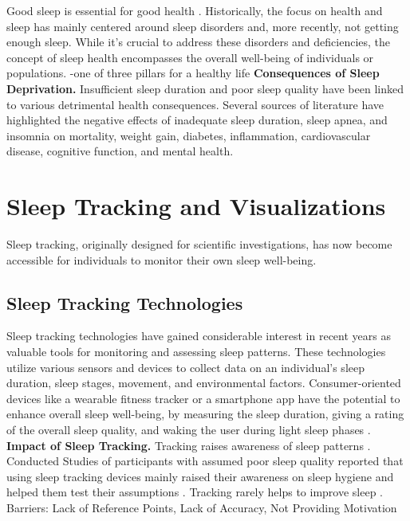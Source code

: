 \documentclass[
  a4paper,  %
  twoside,  %
  bibliography=totoc,
  headsepline,
  cleardoublepage=empty,
  parskip=half,
  draft=false
]{scrbook}
\begin{document}
Good sleep is essential for good health \cite{buysse_sleep_2014, grandner_sleep_2017, ramar_sleep_2021}. Historically, the focus on health and sleep has mainly centered around sleep disorders and, more recently, not getting enough sleep. While it's crucial to address these disorders and deficiencies, the concept of sleep health encompasses the overall well-being of individuals or populations\cite{buysse_sleep_2014}.
\newline
-one of three pillars for a healthy life
\newline
\newline
\textbf{Consequences of Sleep Deprivation.}
Insufficient sleep duration and poor sleep quality have been linked to various detrimental health consequences. Several sources of literature have highlighted the negative effects of inadequate sleep duration, sleep apnea, and insomnia on mortality, weight gain, diabetes, inflammation, cardiovascular disease, cognitive function, and mental health. \cite{grandner_sleep_2017}

\section{Sleep Tracking and Visualizations}
Sleep tracking, originally designed for scientific investigations, has now become accessible for individuals to monitor their own sleep well-being. 
\subsection{Sleep Tracking Technologies}
Sleep tracking technologies have gained considerable interest in recent years as valuable tools for monitoring and assessing sleep patterns. These technologies utilize various sensors and devices to collect data on an individual's sleep duration, sleep stages, movement, and environmental factors. Consumer-oriented devices like a wearable fitness tracker or a smartphone app have the potential to enhance overall sleep well-being, by measuring the sleep duration, giving a rating of the overall sleep quality, and waking the user during light sleep phases \cite{kolla_consumer_2016}.
\newline
\newline
\textbf{Impact of Sleep Tracking.}
Tracking raises awareness of sleep patterns \cite{liang_sleep_2016}. Conducted Studies of participants with assumed poor sleep quality reported that using sleep tracking devices mainly raised their awareness on sleep hygiene and helped them test their assumptions \cite{liang_sleep_2016}. Tracking rarely helps to improve sleep \cite{liang_sleep_2016}.
\newline
Barriers: Lack of Reference Points, Lack of Accuracy, Not Providing Motivation \cite{liang_sleep_2016}
\end{document}
